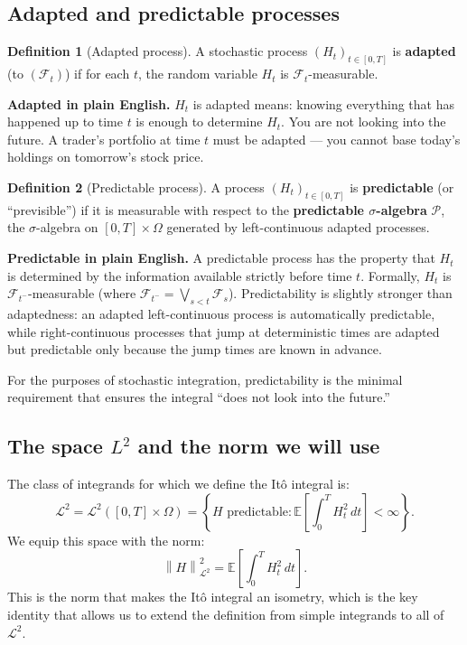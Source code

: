 \documentclass[11pt,a4paper]{article}
\theoremstyle{definition}
\newtheorem{definition}{Definition}[section]
\theoremstyle{plain}
\theoremstyle{remark}
\newcommand{\E}{\mathbb{E}}
\newcommand{\F}{\mathcal{F}}
\newcommand{\calL}{\mathcal{L}}
\newcommand{\norm}[1]{\left\|#1\right\|}
\begin{document}
\subsection{Adapted and predictable processes}

\begin{definition}[Adapted process]
A stochastic process $(H_t)_{t \in [0,T]}$ is \textbf{adapted} (to $(\F_t)$) if for each $t$, the random variable $H_t$ is $\F_t$-measurable.
\end{definition}

\begin{tutobox}
\textbf{Adapted in plain English.}
$H_t$ is adapted means: knowing everything that has happened up to time $t$ is enough to determine $H_t$. You are not looking into the future. A trader's portfolio at time $t$ must be adapted — you cannot base today's holdings on tomorrow's stock price.
\end{tutobox}

\begin{definition}[Predictable process]
A process $(H_t)_{t \in [0,T]}$ is \textbf{predictable} (or ``previsible'') if it is measurable with respect to the \textbf{predictable $\sigma$-algebra} $\mathcal{P}$, the $\sigma$-algebra on $[0,T] \times \Omega$ generated by left-continuous adapted processes.
\end{definition}

\begin{tutobox}
\textbf{Predictable in plain English.}
A predictable process has the property that $H_t$ is determined by the information available strictly before time $t$. Formally, $H_t$ is $\F_{t^-}$-measurable (where $\F_{t^-} = \bigvee_{s < t} \F_s$). Predictability is slightly stronger than adaptedness: an adapted left-continuous process is automatically predictable, while right-continuous processes that jump at deterministic times are adapted but predictable only because the jump times are known in advance.

For the purposes of stochastic integration, predictability is the minimal requirement that ensures the integral ``does not look into the future.''
\end{tutobox}

\subsection{The space \texorpdfstring{$L^2$}{L2} and the norm we will use}

The class of integrands for which we define the Itô integral is:
\[
  \calL^2 = \calL^2([0,T] \times \Omega) = \left\{ H \text{ predictable} : \E\left[\int_0^T H_t^2\,dt\right] < \infty \right\}.
\]
We equip this space with the norm:
\[
  \norm{H}_{\calL^2}^2 = \E\left[\int_0^T H_t^2\,dt\right].
\]
This is the norm that makes the Itô integral an isometry, which is the key identity that allows us to extend the definition from simple integrands to all of $\calL^2$.
\end{document}
